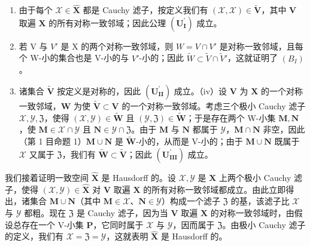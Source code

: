 \begin{enumerate}
\def\labelenumi{(\roman{enumi})}
\item
  由于每个 \(\mathcal{X} \in \hat{\mathbf{X}}\) 都是 Cauchy 滤子，按定义我们有 \((\mathcal{X}, \mathcal{X}) \in \tilde{\mathbf{V}}\)，其中 \(\mathbf{V}\) 取遍 \(\mathbf{X}\) 的所有对称一致邻域；因此公理 \((\mathbf{U}_{\mathbf{I}}^{\prime})\) 成立。
\item
  若 V 与 \(V'\) 是 X 的两个对称一致邻域，则 \(W = V \cap V'\) 是对称一致邻域，且每个 W-小的集合也是 V-小的与 \(V'\)-小的；因此 \(\tilde{W} \subset \tilde{V} \cap \tilde{V}'\)，这就证明了 \((B_{I})\)。
\item
  诸集合 \(\tilde{\mathbf{V}}\) 按定义是对称的，因此 \((\mathbf{U}_{\mathbf{II}}^{\prime})\) 成立。（iv）设 \(\mathbf{V}\) 为 \(\mathbf{X}\) 的一个对称一致邻域，\(\mathbf{W}\) 为使 \(\tilde{\mathbf{V}} \subset \mathbf{V}\) 的一个对称一致邻域。考虑三个极小 Cauchy 滤子 \(\mathcal{X}, \mathcal{Y}, \mathfrak{Z}\)，使得 \((\mathcal{X}, \mathcal{Y}) \in \tilde{\mathbf{W}}\) 且 \((\mathcal{Y}, \mathfrak{Z}) \in \tilde{\mathbf{W}}\)；于是存在两个 W-小集 \(\mathbf{M}, \mathbf{N}\)，使 \(\mathbf{M} \in \mathcal{X} \cap \mathcal{Y}\) 且 \(\mathbf{N} \in \mathcal{Y} \cap \mathfrak{Z}\)。由于 \(\mathbf{M}\) 与 \(\mathbf{N}\) 都属于 \(\mathcal{Y}\)，\(\mathbf{M} \cap \mathbf{N}\) 非空，因此（第 1 目命题 1）\(\mathbf{M} \cup \mathbf{N}\) 是 \(\tilde{\mathbf{W}}\)-小的，从而是 V-小的；由于 \(\mathbf{M} \cup \mathbf{N}\) 既属于 \(\mathcal{X}\) 又属于 \(\mathfrak{Z}\)，我们有 \(\tilde{\mathbf{W}} \subset \tilde{\mathbf{V}}\)；因此 \((\mathbf{U}_{\mathbf{III}}^{\prime})\) 成立。
\end{enumerate}

我们接着证明一致空间 \(\hat{\mathbf{X}}\) 是 Hausdorff 的。设 \(\mathcal{X},\mathcal{Y}\) 是 \(\mathbf{X}\) 上两个极小 Cauchy 滤子，使得 \((\mathcal{X},\mathcal{Y})\in \hat{\mathbf{X}}\) 对 \(\mathbf{V}\) 取遍 \(\mathbf{X}\) 的所有对称一致邻域都成立。由此立即得出，诸集合 \(\mathbf{M}\cup \mathbf{N}\)（其中 \(\mathbf{M}\in \mathcal{X}\)、\(\mathbf{N}\in \mathcal{Y}\)）构成一个滤子 \(\mathfrak{Z}\) 的基，该滤子比 \(\mathcal{X}\) 与 \(\mathcal{Y}\) 都粗。现在 \(\mathfrak{Z}\) 是 Cauchy 滤子，因为当 \(\mathbf{V}\) 取遍 \(\mathbf{X}\) 的对称一致邻域时，由假设总存在一个 V-小集 \(\mathbf{P}\)，它同时属于 \(\mathcal{X}\) 与 \(\mathcal{Y}\)，因而属于 \(\mathfrak{Z}\)。由极小 Cauchy 滤子的定义，我们有 \(\mathcal{X} = \mathfrak{Z} = \mathcal{Y}\)，这就表明 \(\hat{\mathbf{X}}\) 是 Hausdorff 的。

